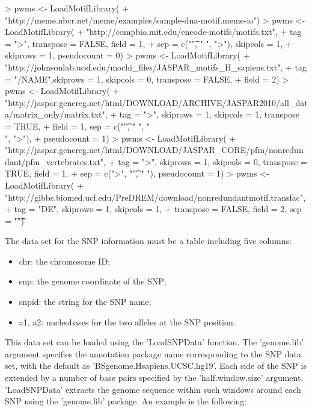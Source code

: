\documentclass[a4paper,10pt]{article}
\begin{document}
\begin{Schunk}
\begin{Sinput}
> pwms <- LoadMotifLibrary(
+  "http://meme.nbcr.net/meme/examples/sample-dna-motif.meme-io")
> pwms <- LoadMotifLibrary(
+  "http://compbio.mit.edu/encode-motifs/motifs.txt",
+  tag = ">", transpose = FALSE, field = 1, 
+  sep = c("\t", " ", ">"), skipcols = 1, 
+  skiprows = 1, pseudocount = 0)
> pwms <- LoadMotifLibrary(
+  "http://johnsonlab.ucsf.edu/mochi_files/JASPAR_motifs_H_sapiens.txt",
+  tag = "/NAME",skiprows = 1, skipcols = 0, transpose = FALSE,
+  field = 2)
> pwms <- LoadMotifLibrary(
+  "http://jaspar.genereg.net/html/DOWNLOAD/ARCHIVE/JASPAR2010/all_data/matrix_only/matrix.txt", 
+  tag = ">", skiprows = 1, skipcols = 1, transpose = TRUE, 
+  field = 1, sep = c("\t", " ", "\\[", "\\]", ">"),
+  pseudocount = 1)
> pwms <- LoadMotifLibrary(
+  "http://jaspar.genereg.net/html/DOWNLOAD/JASPAR_CORE/pfm/nonredundant/pfm_vertebrates.txt",
+  tag = ">", skiprows = 1, skipcols = 0, transpose = TRUE, field = 1, 
+  sep = c(">", "\t", " "), pseudocount = 1)
> pwms <- LoadMotifLibrary(
+  "http://gibbs.biomed.ucf.edu/PreDREM/download/nonredundantmotif.transfac", 
+  tag = "DE", skiprows = 1, skipcols = 1, 
+  transpose = FALSE, field = 2, sep = "\t")
\end{Sinput}
\end{Schunk}

The data set for the SNP information must be a table including five columns:

\begin{itemize}
\item chr: the chromosome ID;
\item snp: the genome coordinate of the SNP;
\item snpid: the string for the SNP name;
\item a1, a2: nucleobases for the two alleles at the SNP position.
\end{itemize}
  
This data set can be loaded using the 'LoadSNPData' function. The 'genome.lib' argument specifies the annotation package name corresponding to the SNP data set, with the default as 'BSgenome.Hsapiens.UCSC.hg19'. Each side of the SNP is extended by a number of base pairs specified by the 'half.window.size' argument. 'LoadSNPData' extracts the genome sequence within such windows around each SNP using the 'genome.lib' package. An example is the following:
\end{document}
